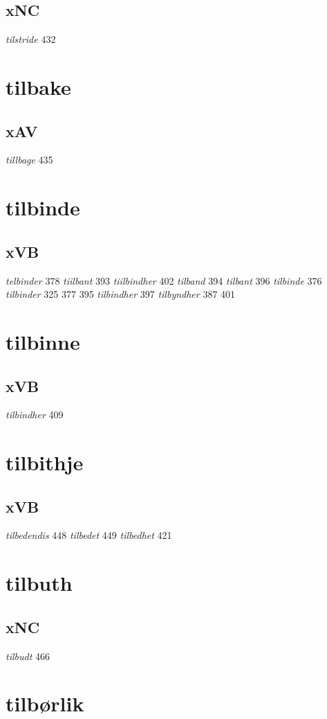 \documentclass[a4paper,twocolumn]{article}
\begin{document}
\subsection{xNC}
\label{sec:orge7424dd}
\emph{tilstride} 432 
\section{tilbake}
\label{sec:org6cf5b37}
\subsection{xAV}
\label{sec:org0004bab}
\emph{tillbage} 435 
\section{tilbinde}
\label{sec:org07cfd61}
\subsection{xVB}
\label{sec:org93f55b1}
\emph{telbinder} 378 \emph{tiilbant} 393 \emph{tiilbindher} 402 \emph{tilband} 394 \emph{tilbant} 396 \emph{tilbinde} 376 \emph{tilbinder} 325 377 395 \emph{tilbindher} 397 \emph{tilbyndher} 387 401 
\section{tilbinne}
\label{sec:org9e6ca5e}
\subsection{xVB}
\label{sec:orgb2b5900}
\emph{tilbindher} 409 
\section{tilbithje}
\label{sec:org82a8b64}
\subsection{xVB}
\label{sec:org5c2f738}
\emph{tilbedendis} 448 \emph{tilbedet} 449 \emph{tilbedhet} 421 
\section{tilbuth}
\label{sec:org40199f1}
\subsection{xNC}
\label{sec:org293b5bb}
\emph{tilbudt} 466 
\section{tilbørlik}
\label{sec:org70e4e1c}
\end{document}
